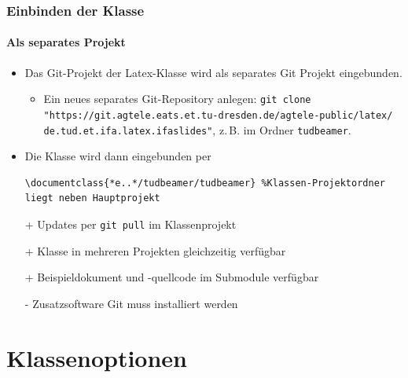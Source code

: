 \documentclass[german,notoc]{tudbeamer}%
\begin{document}
\begin{frame}[fragile]
	\frametitle{Einbinden der Klasse}
	\framesubtitle{Als separates Projekt}

	\begin{itemize}
		\item Das Git-Projekt der Latex-Klasse wird als separates Git Projekt eingebunden.
		\begin{itemize}
			\item Ein neues separates Git-Repository anlegen: 
				\texttt{git clone "https://git.agtele.eats.et.tu-dresden.de/agtele-public/latex/ de.tud.et.ifa.latex.ifaslides"}, z.\,B. im Ordner \texttt{tudbeamer}.
		\end{itemize}
		\item Die Klasse wird dann eingebunden per
			\begin{lstlisting}[gobble=8,style=latex,numbers=none]
				\documentclass{*e..*/tudbeamer/tudbeamer} %Klassen-Projektordner liegt neben Hauptprojekt
			\end{lstlisting}
	\end{itemize}	
	\begin{itemize}
		\item[+] Updates per \texttt{git pull} im Klassenprojekt
		\item[+] Klasse in mehreren Projekten gleichzeitig verfügbar
		\item[+] Beispieldokument und -quellcode im Submodule verfügbar
		\item[-] Zusatzsoftware Git muss installiert werden
	\end{itemize}
\end{frame}

\section{Klassenoptionen}
\end{document}
